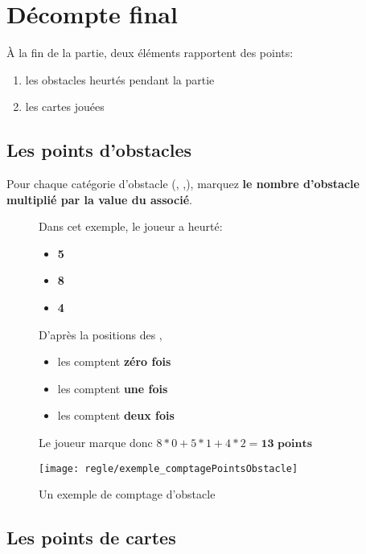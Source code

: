 \section*{Décompte final} \label{sec:comptagePoints}
À la fin de la partie, deux éléments rapportent des points:
\begin{enumerate}
\item les obstacles heurtés pendant la partie
\item les cartes jouées
\end{enumerate}

\subsection*{Les points d'obstacles} \label{sec:pointsObstacles}
Pour chaque catégorie d'obstacle (\arbre, \tronc,\rocher), marquez \textbf{le nombre d'obstacle multiplié par la value du \marqueurObstacle associé}.

\begin{figure}[h]
\begin{tcolorbox}[colback=white,colframe=OliveGreen!75!black,title=Exemple]
{    \begin{multicols}{2}
    Dans cet exemple, le joueur \eau a heurté:
	\begin{itemize}
	\item \textbf{5 \arbre}
	\item \textbf{8 \tronc}
	\item \textbf{4 \rocher}
	\end{itemize}
	D'après la positions des \marqueursObstacles,
	\begin{itemize}
	\item les \tronc comptent \textbf{zéro fois}
	\item les \arbre comptent \textbf{une fois}
	\item les \rocher comptent \textbf{deux fois}
	\end{itemize}
	Le joueur \eau marque donc $8*0+5*1+4*2 = \textbf{13 points}$
    
    \columnbreak
	\texttt{[image: regle/exemple\_comptagePointsObstacle]}
    \caption{Un exemple de comptage d'obstacle}
    \end{multicols}
}
\end{tcolorbox}
\end{figure}
\FloatBarrier


\subsection*{Les points de cartes} \label{sec:pointsCarte}
